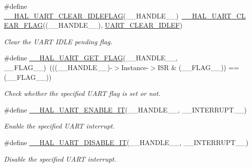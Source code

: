 \begin{DoxyCompactItemize}
\#define \mbox{\hyperlink{group___u_a_r_t___exported___macros_ga1345aa0af53d82269b13835c225e91d0}{\+\_\+\+\_\+\+H\+A\+L\+\_\+\+U\+A\+R\+T\+\_\+\+C\+L\+E\+A\+R\+\_\+\+I\+D\+L\+E\+F\+L\+AG}}(\+\_\+\+\_\+\+H\+A\+N\+D\+L\+E\+\_\+\+\_\+)~\mbox{\hyperlink{group___u_a_r_t___exported___macros_ga9bd035161d41cde4f2568c7af06493bf}{\+\_\+\+\_\+\+H\+A\+L\+\_\+\+U\+A\+R\+T\+\_\+\+C\+L\+E\+A\+R\+\_\+\+F\+L\+AG}}((\+\_\+\+\_\+\+H\+A\+N\+D\+L\+E\+\_\+\+\_\+), \mbox{\hyperlink{group___u_a_r_t___i_t___c_l_e_a_r___flags_ga75ee9be0ac2236931ef3d9514e7dedf4}{U\+A\+R\+T\+\_\+\+C\+L\+E\+A\+R\+\_\+\+I\+D\+L\+EF}})
\begin{DoxyCompactList}\small\item\em Clear the U\+A\+RT I\+D\+LE pending flag. \end{DoxyCompactList}\item 
\#define \mbox{\hyperlink{group___u_a_r_t___exported___macros_ga261fe8a2afe84ec048113654266c5bf6}{\+\_\+\+\_\+\+H\+A\+L\+\_\+\+U\+A\+R\+T\+\_\+\+G\+E\+T\+\_\+\+F\+L\+AG}}(\+\_\+\+\_\+\+H\+A\+N\+D\+L\+E\+\_\+\+\_\+,  \+\_\+\+\_\+\+F\+L\+A\+G\+\_\+\+\_\+)~(((\+\_\+\+\_\+\+H\+A\+N\+D\+L\+E\+\_\+\+\_\+)-\/$>$Instance-\/$>$I\+SR \& (\+\_\+\+\_\+\+F\+L\+A\+G\+\_\+\+\_\+)) == (\+\_\+\+\_\+\+F\+L\+A\+G\+\_\+\+\_\+))
\begin{DoxyCompactList}\small\item\em Check whether the specified U\+A\+RT flag is set or not. \end{DoxyCompactList}\item 
\#define \mbox{\hyperlink{group___u_a_r_t___exported___macros_gaba94165ed584d49c1ec12df9819bd4bb}{\+\_\+\+\_\+\+H\+A\+L\+\_\+\+U\+A\+R\+T\+\_\+\+E\+N\+A\+B\+L\+E\+\_\+\+IT}}(\+\_\+\+\_\+\+H\+A\+N\+D\+L\+E\+\_\+\+\_\+,  \+\_\+\+\_\+\+I\+N\+T\+E\+R\+R\+U\+P\+T\+\_\+\+\_\+)
\begin{DoxyCompactList}\small\item\em Enable the specified U\+A\+RT interrupt. \end{DoxyCompactList}\item 
\#define \mbox{\hyperlink{group___u_a_r_t___exported___macros_ga3c29b33f38658acbf592e9aaf84c6f33}{\+\_\+\+\_\+\+H\+A\+L\+\_\+\+U\+A\+R\+T\+\_\+\+D\+I\+S\+A\+B\+L\+E\+\_\+\+IT}}(\+\_\+\+\_\+\+H\+A\+N\+D\+L\+E\+\_\+\+\_\+,  \+\_\+\+\_\+\+I\+N\+T\+E\+R\+R\+U\+P\+T\+\_\+\+\_\+)
\begin{DoxyCompactList}\small\item\em Disable the specified U\+A\+RT interrupt. \end{DoxyCompactList}\item 

\end{DoxyCompactItemize}
